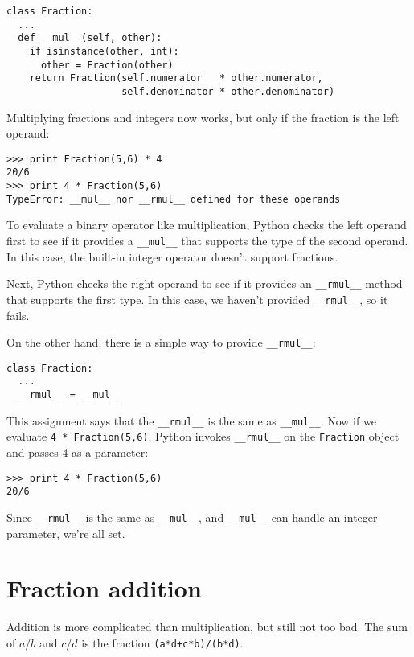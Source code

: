 \beforeverb
\begin{verbatim}
class Fraction:
  ...
  def __mul__(self, other):
    if isinstance(other, int):
      other = Fraction(other)
    return Fraction(self.numerator   * other.numerator,
                    self.denominator * other.denominator)
\end{verbatim}
\afterverb
%
Multiplying fractions and integers now works, but only if the fraction
is the left operand:

\beforeverb
\begin{verbatim}
>>> print Fraction(5,6) * 4
20/6
>>> print 4 * Fraction(5,6)
TypeError: __mul__ nor __rmul__ defined for these operands
\end{verbatim}
\afterverb
%
To evaluate a binary operator like multiplication, Python checks
the left operand first to see if it provides a {\tt \_\_mul\_\_}
that supports the type of the second operand.  In this case,
the built-in integer operator doesn't support fractions.

Next, Python checks the right operand to see if it provides
an {\tt \_\_rmul\_\_} method that supports the first type.  In
this case, we haven't provided {\tt \_\_rmul\_\_}, so it fails.

On the other hand, there is a simple way to provide
{\tt \_\_rmul\_\_}:

\beforeverb
\begin{verbatim}
class Fraction:
  ...
  __rmul__ = __mul__
\end{verbatim}
\afterverb
%
This assignment says that the {\tt \_\_rmul\_\_} is the same
as {\tt \_\_mul\_\_}.
Now if we evaluate {\tt 4 * Fraction(5,6)}, Python invokes
{\tt \_\_rmul\_\_} on the {\tt Fraction} object and passes 4
as a parameter:

\beforeverb
\begin{verbatim}
>>> print 4 * Fraction(5,6)
20/6
\end{verbatim}
\afterverb
%
Since {\tt \_\_rmul\_\_} is the same as {\tt \_\_mul\_\_}, and
{\tt \_\_mul\_\_} can handle an integer parameter, we're all set.


\section{Fraction addition}

Addition is more complicated than multiplication, but still not too
bad.  The sum of $a/b$ and $c/d$ is the fraction
{\tt (a*d+c*b)/(b*d)}.

